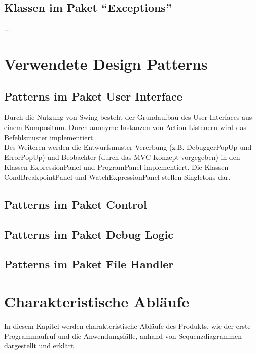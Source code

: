 ﻿\documentclass[parskip=full]{scrartcl}
\begin{document}
\subsection{Klassen im Paket \enquote{Exceptions}} 
...
\section{Verwendete Design Patterns}

\subsection{Patterns im Paket User Interface}
Durch die Nutzung von Swing besteht der Grundaufbau des User Interfaces aus einem Kompositum. 
Durch anonyme Instanzen von Action Listenern wird das Befehlsmuster implementiert. \\
Des Weiteren werden die Entwurfsmuster Vererbung (z.B. DebuggerPopUp und ErrorPopUp) und Beobachter (durch das MVC-Konzept vorgegeben) in den Klassen ExpressionPanel und ProgramPanel implementiert.
Die Klassen CondBreakpointPanel und WatchExpressionPanel stellen Singletons dar.
\subsection{Patterns im Paket Control}
\subsection{Patterns im Paket Debug Logic}
\subsection{Patterns im Paket File Handler}

\newpage
\section{Charakteristische Abläufe}
In diesem Kapitel werden charakteristische Abläufe des Produkts, wie der erste Programmaufruf und die
Anwendungsfälle, anhand von Sequenzdiagrammen dargestellt und erklärt.
\end{document}
